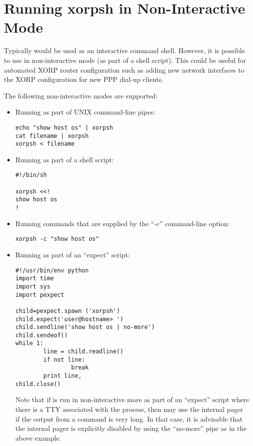 \section{Running xorpsh in Non-Interactive Mode}
\label{xorpsh:non-interactive-mode}

Typically \xorpsh would be used as an interactive command shell.
However, it is possible to use \xorpsh in non-interactive mode
(\eg as part of a shell script). This could be useful for automated
XORP router configuration such as adding new network interfaces
to the XORP configuration for new PPP dial-up clients.

The following non-interactive modes are supported:

\begin{itemize}

  \item Running \xorpsh as part of UNIX command-line pipes:

\begin{verbatim}
echo "show host os" | xorpsh
cat filename | xorpsh
xorpsh < filename
\end{verbatim}

  \item Running \xorpsh as part of a shell script:

\begin{verbatim}
#!/bin/sh

xorpsh <<!
show host os
!
\end{verbatim}

  \item Running commands that are supplied by the ``-c'' \xorpsh
   command-line option:

\begin{verbatim}
xorpsh -c "show host os"
\end{verbatim}

  \item Running \xorpsh as part of an ``expect'' script:

\begin{verbatim}
#!/usr/bin/env python
import time
import sys
import pexpect

child=pexpect.spawn ('xorpsh')
child.expect('user@hostname> ')
child.sendline('show host os | no-more')
child.sendeof()
while 1:
        line = child.readline()
        if not line:
                break
        print line,
child.close()
\end{verbatim}

Note that if \xorpsh is run in non-interactive more as part of an ``expect''
script where there is a TTY associated with the \xorpsh process, then
\xorpsh may use the internal pager if the output from a command is very long.
In that case, it is advisable that the internal pager is explicitly disabled
by using the ``no-more'' pipe as in the above example.

\end{itemize}


